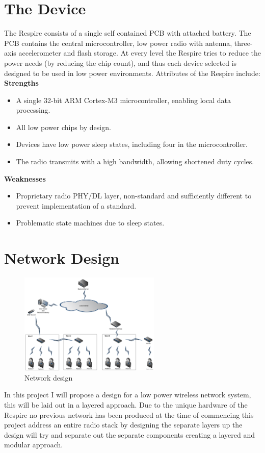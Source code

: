 \section{The Device}
The Respire consists of a single self contained \ac{PCB} with attached battery. The PCB contains the
central microcontroller, low power radio with antenna, three-axis accelerometer and flash storage.
At every level the Respire tries to reduce the power needs (\eg by reducing the chip count), and thus
each device selected is designed to be used in low power environments. Attributes of the Respire
include:\\
\textbf{Strengths}
\begin{itemize}
  \item A single 32-bit ARM Cortex-M3 microcontroller, enabling local data processing.
  \item All low power chips by design.
  \item Devices have low power sleep states, including four in the microcontroller.
  \item The radio transmits with a high bandwidth, allowing shortened duty cycles.
\end{itemize}
\textbf{Weaknesses}
\begin{itemize}
  \item Proprietary radio \ac{PHY}/\ac{DL} layer, non-standard and sufficiently different to prevent implementation of a standard.
  \item Problematic state machines due to sleep states.
\end{itemize}

\section{Network Design}
\begin{figure}
  \vspace{-10pt}
  \begin{center}
    \includegraphics[width=0.6\textwidth, keepaspectratio=true]{images/respire_network.png}
  \end{center}
  \caption[Network Design]{Network design}
  \vspace{-10pt}
\end{figure}
In this project I will propose a design for a low power wireless network system, this will be laid out in
a layered approach. Due to the unique hardware of the Respire no previous network has been
produced at the time of commencing this project address an entire radio stack by designing the
separate layers up the design will try and separate out the separate components creating a layered
and modular approach.

